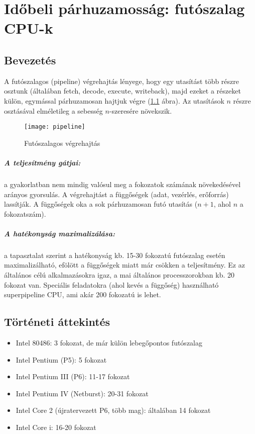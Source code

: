 
\chapter{Időbeli párhuzamosság: futószalag CPU-k}

\section{Bevezetés}
A futószalagos (pipeline) végrehajtás lényege, hogy egy utasítást több részre osztunk (általában fetch, decode, execute, writeback), majd ezeket a részeket külön, egymással párhuzamosan hajtjuk végre (\ref{fig:pipeline} ábra).
Az utasítások $n$ részre osztásával elméletileg a sebesség $n$-szeresére növekszik.
\begin{figure}[h]
    \texttt{[image: pipeline]}
    \centering
    \caption{Futószalagos végrehajtás}
    \label{fig:pipeline}
\end{figure}
\paragraph{A teljesítmény gátjai:} a gyakorlatban nem mindig valósul meg a fokozatok számának növekedésével arányos gyorsulás.
A végrehajtást a függőségek (adat, vezérlés, erőforrás) lassítják. A függőségek oka a sok párhuzamosan futó utasítás ($n+1$, ahol $n$ a fokozatszám).
\paragraph{A hatékonyság maximalizálása:}a tapasztalat szerint a hatékonyság kb. 15-30 fokozatú futószalag esetén maximalizálható, efölött a függőségek miatt már csökken a teljesítmény.
Ez az általános célú alkalmazásokra igaz, a mai általános processzorokban kb. 20 fokozat van. Speciális feladatokra (ahol kevés a függőség) használható superpipeline CPU, ami akár 200 fokozatú is lehet.

\section{Történeti áttekintés}
\begin{itemize}
    \item Intel 80486: 3 fokozat, de már külön lebegőpontos futószalag
    \item Intel Pentium (P5): 5 fokozat
    \item Intel Pentium III (P6): 11-17 fokozat
    \item Intel Pentium IV (Netburst): 20-31 fokozat
    \item Intel Core 2 (újratervezett P6, több mag): általában 14 fokozat
    \item Intel Core i: 16-20 fokozat
\end{itemize}

